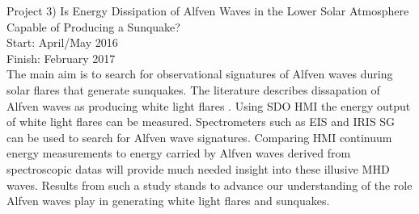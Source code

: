 Project 3) Is Energy Dissipation of Alfven Waves in the Lower Solar Atmosphere Capable of Producing a Sunquake? \\
Start: April/May 2016\\
Finish: February 2017\\

The main aim is to search for observational signatures of Alfven waves during solar flares that generate sunquakes. The literature describes dissapation of Alfven waves as producing white light flares \citep{1982SoPh...80...99E, 2013AGUFMSH51A2091F}. Using SDO HMI the energy output of white light flares can be measured. Spectrometers such as EIS and IRIS SG can be used to search for Alfven wave signatures. Comparing HMI continuum energy measurements to energy carried by Alfven waves derived from spectroscopic datas will provide much needed insight into these illusive MHD waves. Results from such a study stands to advance our understanding of the role Alfven waves play in generating white light flares and sunquakes.   


